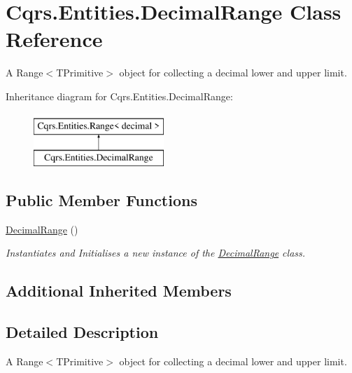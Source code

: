 \hypertarget{classCqrs_1_1Entities_1_1DecimalRange}{}\section{Cqrs.\+Entities.\+Decimal\+Range Class Reference}
\label{classCqrs_1_1Entities_1_1DecimalRange}


A Range$<$\+T\+Primitive$>$ object for collecting a decimal lower and upper limit.  


Inheritance diagram for Cqrs.\+Entities.\+Decimal\+Range\+:\begin{figure}[H]
\begin{center}
\leavevmode
\includegraphics[height=2.000000cm]{classCqrs_1_1Entities_1_1DecimalRange}
\end{center}
\end{figure}
\subsection*{Public Member Functions}
\begin{DoxyCompactItemize}
\item 
\hyperlink{classCqrs_1_1Entities_1_1DecimalRange_a6bc3dc9a228baeff240d1fa3528a13ed_a6bc3dc9a228baeff240d1fa3528a13ed}{Decimal\+Range} ()
\begin{DoxyCompactList}\small\item\em Instantiates and Initialises a new instance of the \hyperlink{classCqrs_1_1Entities_1_1DecimalRange}{Decimal\+Range} class. \end{DoxyCompactList}\end{DoxyCompactItemize}
\subsection*{Additional Inherited Members}


\subsection{Detailed Description}
A Range$<$\+T\+Primitive$>$ object for collecting a decimal lower and upper limit. 



